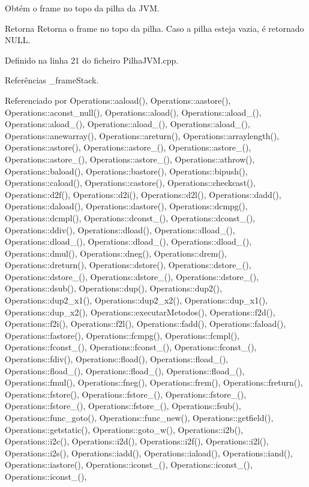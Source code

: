 Obtém o frame no topo da pilha da J\+VM. 

\begin{DoxyReturn}{Retorna}
Retorna o frame no topo da pilha. Caso a pilha esteja vazia, é retornado {\ttfamily N\+U\+LL}. 
\end{DoxyReturn}


Definido na linha 21 do ficheiro Pilha\+J\+V\+M.\+cpp.



Referências \+\_\+frame\+Stack.



Referenciado por Operations\+::aaload(), Operations\+::aastore(), Operations\+::aconst\+\_\+null(), Operations\+::aload(), Operations\+::aload\+\_(), Operations\+::aload\+\_(), Operations\+::aload\+\_(), Operations\+::aload\+\_(), Operations\+::anewarray(), Operations\+::areturn(), Operations\+::arraylength(), Operations\+::astore(), Operations\+::astore\+\_(), Operations\+::astore\+\_(), Operations\+::astore\+\_(), Operations\+::astore\+\_(), Operations\+::athrow(), Operations\+::baload(), Operations\+::bastore(), Operations\+::bipush(), Operations\+::caload(), Operations\+::castore(), Operations\+::checkcast(), Operations\+::d2f(), Operations\+::d2i(), Operations\+::d2l(), Operations\+::dadd(), Operations\+::daload(), Operations\+::dastore(), Operations\+::dcmpg(), Operations\+::dcmpl(), Operations\+::dconst\+\_(), Operations\+::dconst\+\_(), Operations\+::ddiv(), Operations\+::dload(), Operations\+::dload\+\_(), Operations\+::dload\+\_(), Operations\+::dload\+\_(), Operations\+::dload\+\_(), Operations\+::dmul(), Operations\+::dneg(), Operations\+::drem(), Operations\+::dreturn(), Operations\+::dstore(), Operations\+::dstore\+\_(), Operations\+::dstore\+\_(), Operations\+::dstore\+\_(), Operations\+::dstore\+\_(), Operations\+::dsub(), Operations\+::dup(), Operations\+::dup2(), Operations\+::dup2\+\_\+x1(), Operations\+::dup2\+\_\+x2(), Operations\+::dup\+\_\+x1(), Operations\+::dup\+\_\+x2(), Operations\+::executar\+Metodos(), Operations\+::f2d(), Operations\+::f2i(), Operations\+::f2l(), Operations\+::fadd(), Operations\+::faload(), Operations\+::fastore(), Operations\+::fcmpg(), Operations\+::fcmpl(), Operations\+::fconst\+\_(), Operations\+::fconst\+\_(), Operations\+::fconst\+\_(), Operations\+::fdiv(), Operations\+::fload(), Operations\+::fload\+\_(), Operations\+::fload\+\_(), Operations\+::fload\+\_(), Operations\+::fload\+\_(), Operations\+::fmul(), Operations\+::fneg(), Operations\+::frem(), Operations\+::freturn(), Operations\+::fstore(), Operations\+::fstore\+\_(), Operations\+::fstore\+\_(), Operations\+::fstore\+\_(), Operations\+::fstore\+\_(), Operations\+::fsub(), Operations\+::func\+\_\+goto(), Operations\+::func\+\_\+new(), Operations\+::getfield(), Operations\+::getstatic(), Operations\+::goto\+\_\+w(), Operations\+::i2b(), Operations\+::i2c(), Operations\+::i2d(), Operations\+::i2f(), Operations\+::i2l(), Operations\+::i2s(), Operations\+::iadd(), Operations\+::iaload(), Operations\+::iand(), Operations\+::iastore(), Operations\+::iconst\+\_(), Operations\+::iconst\+\_(), Operations\+::iconst\+\_(), 